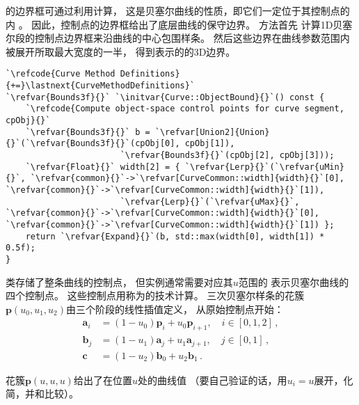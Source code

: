 的边界框可通过利用计算，
这是贝塞尔曲线的性质，即它们一定位于其控制点的内
。
因此，控制点的边界框给出了底层曲线的保守边界。
方法首先
计算1D贝塞尔段的控制点边界框来沿曲线的中心包围样条。
然后这些边界在曲线参数范围内被展开所取最大宽度的一半，
得到表示的的3D边界。
\begin{lstlisting}
`\refcode{Curve Method Definitions}{+=}\lastnext{CurveMethodDefinitions}`
`\refvar{Bounds3f}{}` `\initvar{Curve::ObjectBound}{}`() const {
    `\refcode{Compute object-space control points for curve segment, cpObj}{}`
    `\refvar{Bounds3f}{}` b = `\refvar[Union2]{Union}{}`(`\refvar{Bounds3f}{}`(cpObj[0], cpObj[1]),
                       `\refvar{Bounds3f}{}`(cpObj[2], cpObj[3]));
    `\refvar{Float}{}` width[2] = { `\refvar{Lerp}{}`(`\refvar{uMin}{}`, `\refvar{common}{}`->`\refvar[CurveCommon::width]{width}{}`[0], `\refvar{common}{}`->`\refvar[CurveCommon::width]{width}{}`[1]),
                       `\refvar{Lerp}{}`(`\refvar{uMax}{}`, `\refvar{common}{}`->`\refvar[CurveCommon::width]{width}{}`[0], `\refvar{common}{}`->`\refvar[CurveCommon::width]{width}{}`[1]) };
    return `\refvar{Expand}{}`(b, std::max(width[0], width[1]) * 0.5f);
}
\end{lstlisting}

类存储了整条曲线的控制点，
但实例通常需要对应其$u$范围的
表示贝塞尔曲线的四个控制点。
这些控制点用称为的技术计算。
三次贝塞尔样条的花簇$\bm p(u_0,u_1,u_2)$由三个阶段的线性插值定义，
从原始控制点开始：
\begin{align}\label{eq:3.4}
    \bm a_i & =(1-u_0)\bm p_i+u_0\bm p_{i+1},\quad i\in[0,1,2]\nonumber\, , \\
    \bm b_j & =(1-u_1)\bm a_j+u_1\bm a_{j+1},\quad j\in[0,1]\nonumber\, ,   \\
    \bm c   & =(1-u_2)\bm b_0+u_2\bm b_1\, .
\end{align}

花簇$\bm p(u,u,u)$给出了在位置$u$处的曲线值
（要自己验证的话，用$u_i=u$展开，化简，并和比较）。

